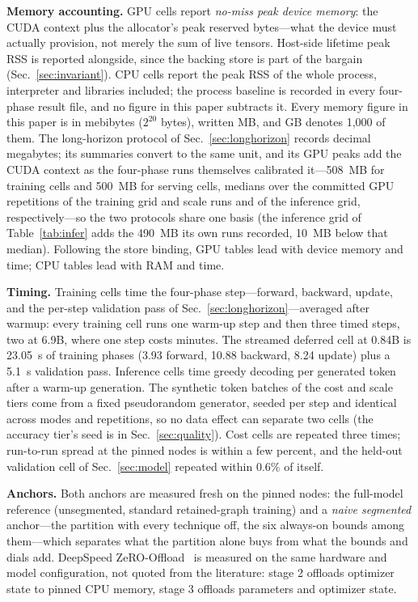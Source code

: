 \documentclass[journal]{IEEEtran}
\begin{document}
\textbf{Memory accounting.} GPU cells report \emph{no-miss peak device
memory}: the CUDA context plus the allocator's peak reserved bytes---what the
device must actually provision, not merely the sum of live tensors. Host-side
lifetime peak RSS is reported alongside, since the backing store is part of
the bargain (Sec.~\ref{sec:invariant}). CPU cells report the peak RSS of the
whole process, interpreter and libraries included; the process baseline is
recorded in every four-phase result file, and no figure in this paper
subtracts it. Every memory figure in this paper is in mebibytes ($2^{20}$
bytes), written MB, and GB denotes 1{,}000 of them. The long-horizon
protocol of Sec.~\ref{sec:longhorizon}
records decimal megabytes; its summaries convert to the same unit, and its
GPU peaks add the CUDA context as the four-phase runs themselves calibrated
it---508~MB for training cells and 500~MB for serving cells, medians over
the committed GPU repetitions of the training grid and scale runs and of
the inference grid, respectively---so the two protocols share one basis
(the inference grid of Table~\ref{tab:infer} adds the 490~MB its own runs
recorded, 10~MB below that median).
Following the store
binding, GPU tables lead with device memory and time; CPU tables lead with
RAM and time.

\textbf{Timing.} Training cells time the four-phase step---forward,
backward, update, and the per-step validation pass of
Sec.~\ref{sec:longhorizon}---averaged after warmup: every training cell runs
one warm-up step and then three timed steps, two at 6.9B, where one step costs
minutes. The streamed deferred cell at 0.84B is 23.05~s of training phases
(3.93 forward, 10.88 backward, 8.24 update) plus a 5.1~s validation pass. Inference cells time greedy decoding per generated token after a
warm-up generation. The synthetic token batches of the cost and scale tiers
come from a fixed pseudorandom generator, seeded per step and identical across
modes and repetitions, so no data effect can separate two cells (the accuracy
tier's seed is in Sec.~\ref{sec:quality}). Cost cells are
repeated three times; run-to-run spread at the pinned nodes is within a few
percent, and the held-out validation cell of Sec.~\ref{sec:model} repeated
within 0.6\% of itself.

\textbf{Anchors.} Both anchors are measured fresh on the pinned nodes: the
full-model reference (unsegmented, standard retained-graph training) and a
\emph{naive segmented} anchor---the partition with every technique off,
the six always-on bounds among them---which separates what the partition
alone buys from what the bounds and dials add. DeepSpeed
ZeRO-Offload~\cite{ren2021zerooffload} is measured on the same hardware and
model configuration, not quoted from the literature: stage 2 offloads
optimizer state to pinned CPU memory, stage 3 offloads parameters and
optimizer state.
\end{document}

